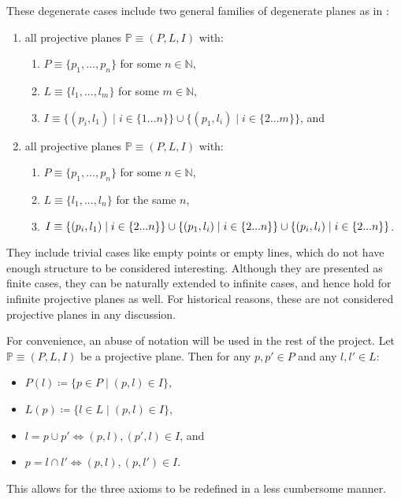 \documentclass{report}
\newcommand{\N}{\mathbb{N}}
\renewcommand{\P}{\mathbb{P}}
\theoremstyle{definition}\newtheorem*{definition}{Definition}
\theoremstyle{definition}\newtheorem*{example}{Example}
\theoremstyle{remark}\newtheorem*{remark}{Remark}
\begin{document}
These degenerate cases include two general families of degenerate planes as in \cite{degenerate}:
\begin{enumerate}
  \item all projective planes $ \P \equiv (P, L, I) $ with:
    \begin{enumerate}
      \item $ P \equiv \{ p_1, ..., p_n \} $ for some $ n \in \N $,
      \item $ L \equiv \{ l_1, ..., l_m \} $ for some $ m \in \N $,
      \item $ I \equiv \{ (p_i, l_1) \mid i \in \{ 1 ... n \} \} \cup \{ (p_1, l_i) \mid i \in \{ 2 ... m \} \} $, and
    \end{enumerate}
  \item all projective planes $ \P \equiv (P, L, I) $ with:
    \begin{enumerate}
      \item $ P \equiv \{ p_1, ..., p_n \} $ for some $ n \in \N $,
      \item $ L \equiv \{ l_1, ..., l_n \} $ for the same $ n $,
      \item $ I \equiv \{ (p_i, l_1) \mid i \in \{ 2 ... n \} \} \\ \cup \{ (p_1, l_i) \mid i \in \{ 2 ... n \} \} \cup \{ (p_i, l_i) \mid i \in \{ 2 ... n \} \} $.
    \end{enumerate}
\end{enumerate}
They include trivial cases like empty points or empty lines, which do not have enough structure to be considered interesting. Although they are presented as finite cases, they can be naturally extended to infinite cases, and hence hold for infinite projective planes as well. For historical reasons, these are not considered projective planes in any discussion.

For convenience, an abuse of notation will be used in the rest of the project. Let $ \P \equiv (P, L, I) $ be a projective plane. Then for any $ p, p' \in P $ and any $ l, l' \in L $:
\begin{itemize}
  \item $ P(l) \coloneqq \{ p \in P \mid (p, l) \in I \} $,
  \item $ L(p) \coloneqq \{ l \in L \mid (p, l) \in I \} $,
  \item $ l = p \cup p' \Leftrightarrow (p, l), (p', l) \in I $, and
  \item $ p = l \cap l' \Leftrightarrow (p, l), (p, l') \in I $.
\end{itemize}
This allows for the three axioms to be redefined in a less cumbersome manner.
\end{document}
